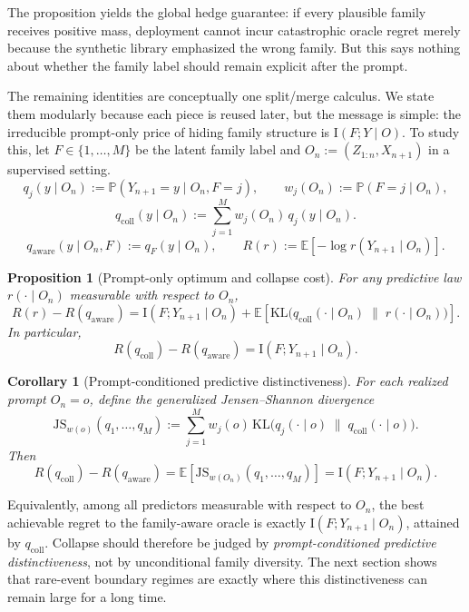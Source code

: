 \documentclass{article}
\newtheorem{proposition}[theorem]{Proposition}
\newtheorem{corollary}[theorem]{Corollary}
\theoremstyle{definition}
\theoremstyle{remark}
\newcommand{\E}{\mathbb{E}}
\newcommand{\Pbb}{\mathbb{P}}
\newcommand{\KL}{\mathrm{KL}}
\newcommand{\I}{\mathrm{I}}
\newcommand{\JS}{\mathrm{JS}}
\begin{document}
The proposition yields the global hedge guarantee: if every plausible family receives positive mass, deployment cannot incur catastrophic oracle regret merely because the synthetic library emphasized the wrong family. But this says nothing about whether the family label should remain explicit after the prompt.

The remaining identities are conceptually one split/merge calculus. We state them modularly because each piece is reused later, but the message is simple: the irreducible prompt-only price of hiding family structure is $\I(F;Y\mid O)$. To study this, let $F\in\{1,\dots,M\}$ be the latent family label and $O_n:=(Z_{1:n},X_{n+1})$ in a supervised setting.
\[
q_j(y\mid O_n):=\Pbb(Y_{n+1}=y\mid O_n,F=j),
\qquad
w_j(O_n):=\Pbb(F=j\mid O_n),
\]
\[
q_{\mathrm{coll}}(y\mid O_n):=\sum_{j=1}^M w_j(O_n)\,q_j(y\mid O_n).
\]
\[
q_{\mathrm{aware}}(y\mid O_n,F):=q_F(y\mid O_n),
\qquad
R(r):=\E[-\log r(Y_{n+1}\mid O_n)].
\]

\begin{proposition}[Prompt-only optimum and collapse cost]
\label{prop:prompt-opt}
For any predictive law $r(\cdot\mid O_n)$ measurable with respect to $O_n$,
\[
R(r)-R(q_{\mathrm{aware}})
=
\I(F;Y_{n+1}\mid O_n)
+
\E\!\left[
\KL\bigl(
q_{\mathrm{coll}}(\cdot\mid O_n)
\;\|\;
r(\cdot\mid O_n)
\bigr)
\right].
\]
In particular,
\[
R(q_{\mathrm{coll}})-R(q_{\mathrm{aware}})
=
\I(F;Y_{n+1}\mid O_n).
\]
\end{proposition}

\begin{corollary}[Prompt-conditioned predictive distinctiveness]
\label{cor:js}
For each realized prompt $O_n=o$, define the generalized Jensen--Shannon divergence
\[
\JS_{w(o)}(q_1,\dots,q_M)
:=
\sum_{j=1}^M w_j(o)\,
\KL\bigl(
q_j(\cdot\mid o)
\;\|\;
q_{\mathrm{coll}}(\cdot\mid o)
\bigr).
\]
Then
\[
R(q_{\mathrm{coll}})-R(q_{\mathrm{aware}})
=
\E\!\left[
\JS_{w(O_n)}(q_1,\dots,q_M)
\right]
=
\I(F;Y_{n+1}\mid O_n).
\]
\end{corollary}

Equivalently, among all predictors measurable with respect to $O_n$, the best achievable regret to the family-aware oracle is exactly $\I(F;Y_{n+1}\mid O_n)$, attained by $q_{\mathrm{coll}}$. Collapse should therefore be judged by \emph{prompt-conditioned predictive distinctiveness}, not by unconditional family diversity. The next section shows that rare-event boundary regimes are exactly where this distinctiveness can remain large for a long time.
\end{document}
